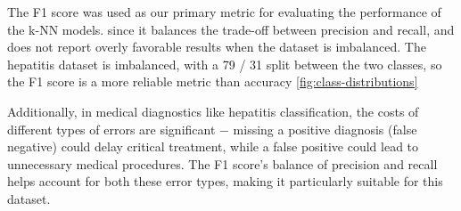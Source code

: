 The F1 score was used as our primary metric for evaluating the performance of the k-NN models.
since it balances the trade-off between precision and recall, and does not report overly favorable results when the dataset is imbalanced.
The hepatitis dataset is imbalanced, with a 79 / 31 split between the two classes, so the F1 score is a more reliable metric than accuracy \autoref{fig:class-distributions}

Additionally, in medical diagnostics like hepatitis classification, the costs of different types of errors are significant $-$ 
missing a positive diagnosis (false negative) could delay critical treatment,
while a false positive could lead to unnecessary medical procedures.
The F1 score's balance of precision and recall helps account for both these error types, making it particularly suitable for this dataset.